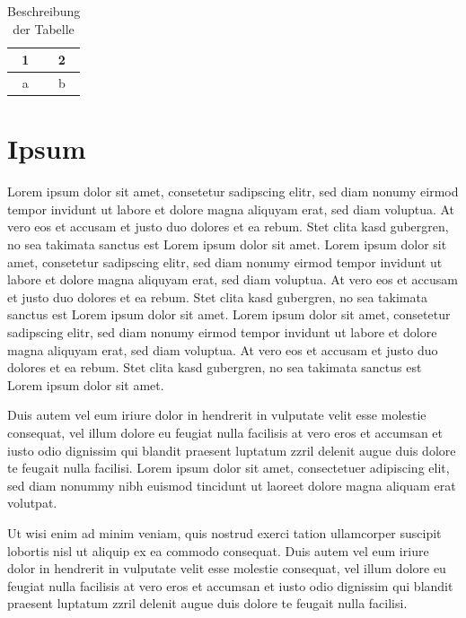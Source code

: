 \begin{table}[h!] %
\centering
\begin{tabular}{|c|c|}
\hline 
1 & 2 \\ 
\hline 
a & b \\ 
\hline 
\end{tabular} 
\caption[Name der Tabelle im Tabellenverzeichnis]{Beschreibung der Tabelle}
\label{tab:tabelle}
\end{table}

\section{Ipsum}
Lorem ipsum dolor sit amet, consetetur sadipscing elitr, sed diam nonumy eirmod tempor invidunt ut labore et dolore magna aliquyam erat, sed diam voluptua. At vero eos et accusam et justo duo dolores et ea rebum. Stet clita kasd gubergren, no sea takimata sanctus est Lorem ipsum dolor sit amet. Lorem ipsum dolor sit amet, consetetur sadipscing elitr, sed diam nonumy eirmod tempor invidunt ut labore et dolore magna aliquyam erat, sed diam voluptua. At vero eos et accusam et justo duo dolores et ea rebum. Stet clita kasd gubergren, no sea takimata sanctus est Lorem ipsum dolor sit amet. Lorem ipsum dolor sit amet, consetetur sadipscing elitr, sed diam nonumy eirmod tempor invidunt ut labore et dolore magna aliquyam erat, sed diam voluptua. At vero eos et accusam et justo duo dolores et ea rebum. Stet clita kasd gubergren, no sea takimata sanctus est Lorem ipsum dolor sit amet.   

Duis autem vel eum iriure dolor in hendrerit in vulputate velit esse molestie consequat, vel illum dolore eu feugiat nulla facilisis at vero eros et accumsan et iusto odio dignissim qui blandit praesent luptatum zzril delenit augue duis dolore te feugait nulla facilisi. Lorem ipsum dolor sit amet, consectetuer adipiscing elit, sed diam nonummy nibh euismod tincidunt ut laoreet dolore magna aliquam erat volutpat.   

Ut wisi enim ad minim veniam, quis nostrud exerci tation ullamcorper suscipit lobortis nisl ut aliquip ex ea commodo consequat. Duis autem vel eum iriure dolor in hendrerit in vulputate velit esse molestie consequat, vel illum dolore eu feugiat nulla facilisis at vero eros et accumsan et iusto odio dignissim qui blandit praesent luptatum zzril delenit augue duis dolore te feugait nulla facilisi.  